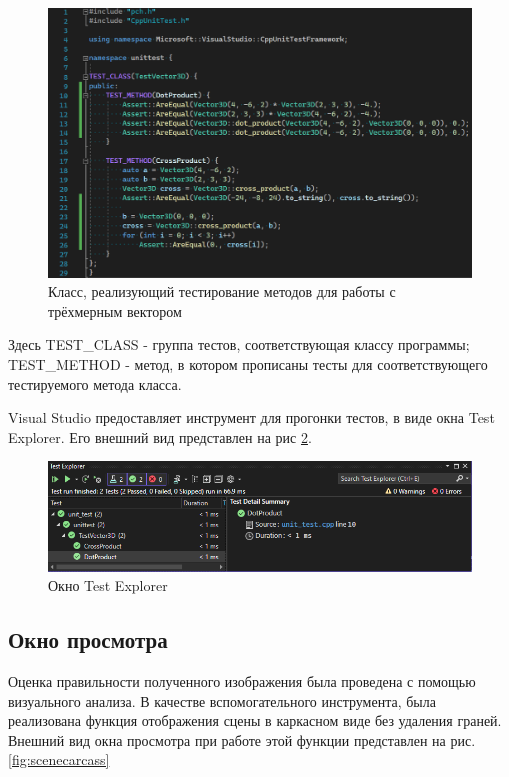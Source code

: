 \documentclass[a4paper, 14pt]{report} %
\begin{document}
	\begin{figure}[ht]
		\centering
		\includegraphics[width=1\linewidth]{img/test_code}
		\caption{Класс, реализующий тестирование методов для работы с трёхмерным вектором}
		\label{fig:test_code}
	\end{figure}
	
	Здесь TEST\_CLASS - группа тестов, соответствующая классу программы; TEST\_METHOD - метод, в котором прописаны тесты для соответствующего тестируемого метода класса.
	
	Visual Studio предоставляет инструмент для прогонки тестов, в виде окна Test Explorer. Его внешний вид представлен на рис \ref{fig:test_explorer}.
	
	\begin{figure}[ht]
		\centering
		\includegraphics[width=1\linewidth]{img/test_explorer}
		\caption{Окно Test Explorer}
		\label{fig:test_explorer}
	\end{figure}
	
	
	\subsection{Окно просмотра}
	Оценка правильности полученного изображения была проведена с помощью визуального анализа. В качестве вспомогательного инструмента, была реализована функция отображения сцены в каркасном виде без удаления граней. Внешний вид окна просмотра при работе этой функции представлен на рис. \ref{fig:scenecarcass}
	
\end{document}
